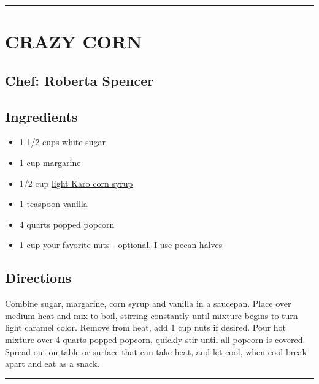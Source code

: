 \documentclass[
]{book}
\providecommand{\tightlist}{%
  \setlength{\itemsep}{0pt}\setlength{\parskip}{0pt}}
\begin{document}
\begin{center}\rule{0.5\linewidth}{0.5pt}\end{center}

\hypertarget{crazy-corn}{%
\section*{CRAZY CORN}\label{crazy-corn}}


\hypertarget{chef-roberta-spencer-33}{%
\subsection*{Chef: Roberta Spencer}\label{chef-roberta-spencer-33}}


\hypertarget{ingredients-95}{%
\subsection*{Ingredients}\label{ingredients-95}}


\begin{itemize}
\tightlist
\item
  1 1/2 cups white sugar
\item
  1 cup margarine
\item
  1/2 cup \href{https://en.wikipedia.org/wiki/Corn_syrup}{light Karo corn syrup}
\item
  1 teaspoon vanilla
\item
  4 quarts popped popcorn
\item
  1 cup your favorite nuts - optional, I use pecan halves
\end{itemize}

\hypertarget{directions-95}{%
\subsection*{Directions}\label{directions-95}}


Combine sugar, margarine, corn syrup and vanilla in a saucepan. Place over medium heat and mix to boil, stirring constantly until mixture begins to turn light caramel color. Remove from heat, add 1 cup nuts if desired. Pour hot mixture over 4 quarts popped popcorn, quickly stir until all popcorn is covered. Spread out on table or surface that can take heat, and let cool, when cool break apart and eat as a snack.

\begin{center}\rule{0.5\linewidth}{0.5pt}\end{center}
\end{document}
